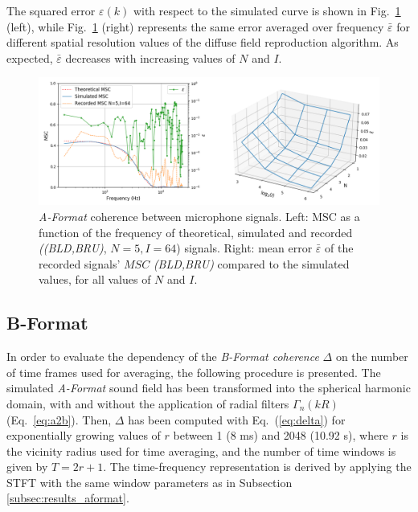 The squared error $\varepsilon(k)$ with respect to the simulated curve is shown in Fig.~\ref{fig:Fig1} (left), while Fig.~\ref{fig:Fig1} (right) represents the same error averaged over frequency $\bar{\varepsilon}$ for different spatial resolution values of the diffuse field reproduction algorithm.
As expected, $\bar{\varepsilon}$ decreases with increasing values of $N$ and $I$.

\begin{figure}[th]
	\includegraphics[width=\textwidth]{Figures/CoherenceEstimation/Untitled1}
    \caption{\label{fig:Fig1}\textit{A-Format} coherence between microphone signals. Left: $\text{MSC}$ as a function of the frequency of theoretical, simulated and recorded \textit{((BLD,BRU)},  $N=5, I=64$) signals. Right: mean error $\bar{\varepsilon}$ of the recorded signals' $MSC$ \textit{(BLD,BRU)} compared to the simulated values, for all values of $N$ and $I$.}
\end{figure}


\newpage

\subsection{B-Format} 

In order to evaluate the dependency of the \textit{B-Format coherence} $\Delta$ on the number of time frames used for averaging, the following procedure is presented.
The simulated \textit{A-Format} sound field has been transformed into the spherical harmonic domain, with and without the application of radial filters $\Gamma_n(kR)$ (Eq.~\ref{eq:a2b}). Then, $\Delta$ has been computed with Eq.~(\ref{eq:delta}) for exponentially growing values of $r$ between 1 (8 ms) and 2048 (10.92 s), where $r$ is the vicinity radius used for time averaging, and the number of time windows is given by $T = 2r+1$.
The time-frequency representation is derived by applying the STFT with the same window parameters as in Subsection \ref{subsec:results_aformat}.\\

